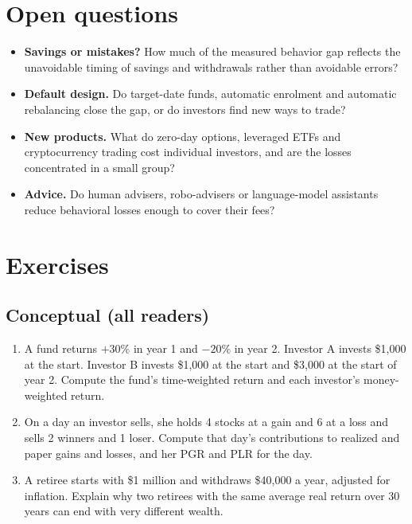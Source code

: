 \section{Open questions}
\label{sec:24-open}

\begin{itemize}
  \item \textbf{Savings or mistakes?} How much of the measured behavior gap reflects the unavoidable timing of savings and withdrawals rather than avoidable errors?
  \item \textbf{Default design.} Do target-date funds, automatic enrolment and automatic rebalancing close the gap, or do investors find new ways to trade?
  \item \textbf{New products.} What do zero-day options, leveraged ETFs and cryptocurrency trading cost individual investors, and are the losses concentrated in a small group?
  \item \textbf{Advice.} Do human advisers, robo-advisers or language-model assistants reduce behavioral losses enough to cover their fees?
\end{itemize}

\section*{Exercises}

\subsection*{Conceptual (all readers)}

\begin{enumerate}
  \item A fund returns $+30\%$ in year 1 and $-20\%$ in year 2. Investor A invests \$1,000 at the start. Investor B invests \$1,000 at the start and \$3,000 at the start of year 2. Compute the fund's time-weighted return and each investor's money-weighted return.
  \item On a day an investor sells, she holds 4 stocks at a gain and 6 at a loss and sells 2 winners and 1 loser. Compute that day's contributions to realized and paper gains and losses, and her PGR and PLR for the day.
  \item A retiree starts with \$1 million and withdraws \$40,000 a year, adjusted for inflation. Explain why two retirees with the same average real return over 30 years can end with very different wealth.
\end{enumerate}

